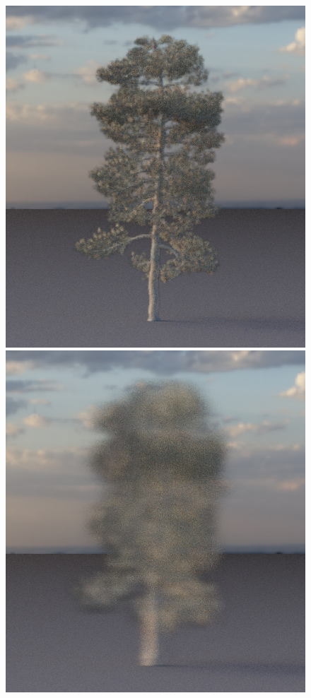 \begin{figure}[t]
\begin{center}
\begin{minipage}[c]{0.24\textwidth}
            \includegraphics[valign=c, width=\linewidth]{img/CL13a_0.1.png}
        \end{minipage}
        \begin{minipage}[c]{0.24\textwidth}
            \includegraphics[valign=c, width=\linewidth]{img/CL13a_0.8.png}

\end{minipage}
\end{center}
\end{figure}
